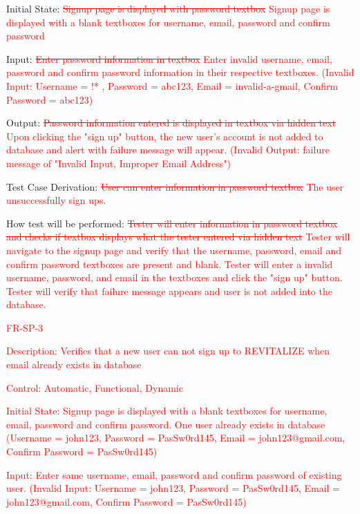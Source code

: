 \documentclass[12pt, titlepage]{article}
\begin{document}
\begin{enumerate}
        Initial State: \textcolor{red}{\sout{Signup page is displayed with password textbox}} \textcolor{red}{Signup page is displayed with a blank textboxes for username, email, password and confirm password }
	
	Input: \textcolor{red}{\sout{Enter password information in textbox}} \textcolor{red}{Enter invalid username, email, password and confirm password information in their respective textboxes. (Invalid Input: Username = !* , Password = abc123, Email = invalid-a-gmail, Confirm Password = abc123)}
	
	Output: \textcolor{red}{\sout{Password information entered is displayed in textbox via hidden text}} \textcolor{red}{Upon clicking the "sign up" button, the new user's account is not added to database and alert with failure message will appear. (Invalid Output: failure message of "Invalid Input, Improper Email Address")}
	
	Test Case Derivation:  \textcolor{red}{\sout{User can enter information in password textbox}} \textcolor{red}{The user unsuccessfully sign ups.} 
	
	How test will be performed: \textcolor{red}{\sout{Tester will enter information in password textbox and checks if textbox displays what the tester entered via hidden text}} \textcolor{red}{Tester will navigate to the signup page and verify that the username, password, email and confirm password textboxes are present and blank. Tester will enter a invalid username, password, and email in the textboxes and click the "sign up" button. Tester will verify that failure message appears and user is not added into the database.}

         \textcolor{red}{\item{FR-SP-3\\}}

        \textcolor{red}{Description: Verifies that a new user can not sign up to REVITALIZE when email already exists in database}
	
	\textcolor{red}{Control: Automatic, Functional, Dynamic}
	
	\textcolor{red}{Initial State: Signup page is displayed with a blank textboxes for username, email, password and confirm password. One user already exists in database (Username = john123, Password = PasSw0rd145, Email = john123@gmail.com, Confirm Password = PasSw0rd145)}
	
	\textcolor{red}{Input: Enter same username, email, password and confirm password of existing user. (Invalid Input: Username = john123, Password = PasSw0rd145, Email = john123@gmail.com, Confirm Password = PasSw0rd145)}
	

\end{enumerate}
\end{document}
